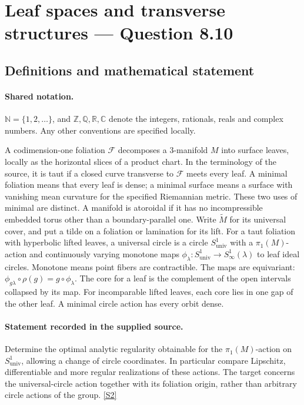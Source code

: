 \documentclass[11pt]{article}
\newcommand{\sref}[2]{\hyperlink{source:#1:#2}{[S#2]}}
\begin{document}
\section{Leaf spaces and transverse structures — Question 8.10}\label{statement}

\subsection{Definitions and mathematical statement}

\paragraph{Shared notation.}$\mathbb N=\{1,2,\ldots\}$, and $\mathbb Z,\mathbb Q,\mathbb R,\mathbb C$ denote the integers, rationals, reals and complex numbers. Any other conventions are specified locally.


A codimension-one foliation $\mathcal F$ decomposes a $3$-manifold $M$ into surface leaves, locally as the horizontal slices of a product chart. In the terminology of the source, it is taut if a closed curve transverse to $\mathcal F$ meets every leaf. A minimal foliation means that every leaf is dense; a minimal surface means a surface with vanishing mean curvature for the specified Riemannian metric. These two uses of minimal are distinct. A manifold is atoroidal if it has no incompressible embedded torus other than a boundary-parallel one. Write $\widetilde M$ for its universal cover, and put a tilde on a foliation or lamination for its lift. For a taut foliation with hyperbolic lifted leaves, a universal circle is a circle $S^1_{\mathrm{univ}}$ with a $\pi_1(M)$-action and continuously varying monotone maps $\phi_\lambda:S^1_{\mathrm{univ}}\to S^1_\infty(\lambda)$ to leaf ideal circles. Monotone means point fibers are contractible. The maps are equivariant: $\phi_{g\lambda}\circ\rho(g)=g\circ\phi_\lambda$. The core for a leaf is the complement of the open intervals collapsed by its map. For incomparable lifted leaves, each core lies in one gap of the other leaf. A minimal circle action has every orbit dense.
\paragraph{Statement recorded in the supplied source.}
Determine the optimal analytic regularity obtainable for the $\pi_1(M)$-action on $S^1_{\mathrm{univ}}$, allowing a change of circle coordinates. In particular compare Lipschitz, differentiable and more regular realizations of these actions. The target concerns the universal-circle action together with its foliation origin, rather than arbitrary circle actions of the group. \sref{statement}{2}
\end{document}
